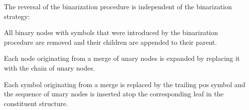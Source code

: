 \documentclass[../../document.tex]{subfiles}
\begin{document}
    The reversal of the binarization procedure is independent of the binarization strategy:
    \begin{compactenum}
        \item All binary nodes with symbols that were introduced by the binarization procedure are removed and their children are appended to their parent.
        \item Each node originating from a merge of unary nodes is expanded by replacing it with the chain of unary nodes.
        \item Each  symbol originating from a merge is replaced by the trailing pos symbol and the sequence of unary nodes is inserted atop the corresponding leaf in the constituent structure.
    \end{compactenum}

\end{document}
